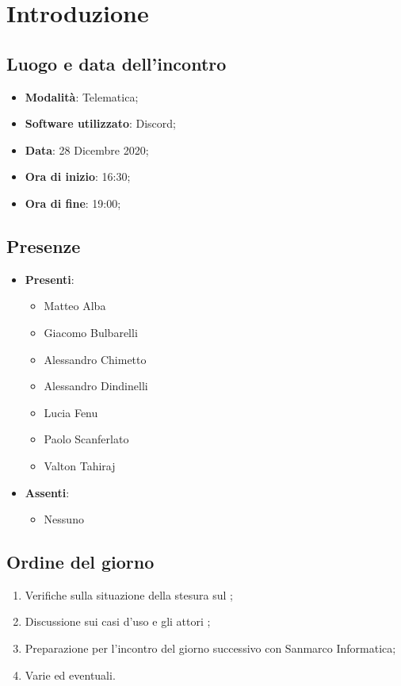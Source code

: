 \documentclass[]{article}
\begin{document}
	
	
	
	\newpage
	
	\section{Introduzione}
		\subsection{Luogo e data dell'incontro}
		\begin{itemize}
			\item \textbf{Modalità}: Telematica;
			\item \textbf{Software utilizzato}: Discord;
			\item \textbf{Data}: 28 Dicembre 2020;
			\item \textbf{Ora di inizio}: 16:30;
			\item \textbf{Ora di fine}: 19:00;
		\end{itemize}

		\subsection{Presenze}
		\begin{itemize}
			\item \textbf{Presenti}:
		\begin{itemize}
			\item Matteo Alba
			\item Giacomo Bulbarelli
			\item Alessandro Chimetto
			\item Alessandro Dindinelli
			\item Lucia Fenu
			\item Paolo Scanferlato
			\item Valton Tahiraj
		\end{itemize}
			\item \textbf{Assenti}:
			\begin{itemize}
				\item Nessuno
			\end{itemize}
		\end{itemize}
	
		\subsection{Ordine del giorno}
		\begin{enumerate}
			\item Verifiche sulla situazione della stesura sul ;
			\item Discussione sui casi d'uso e gli attori ;
			\item Preparazione per l'incontro del giorno successivo con Sanmarco Informatica;
			\item Varie ed eventuali.
		\end{enumerate}
	
\end{document}
